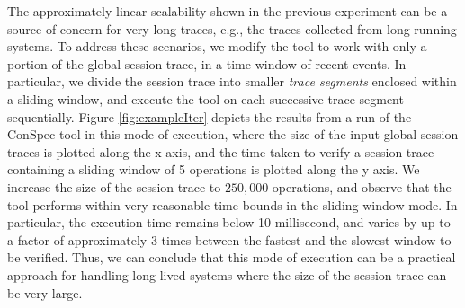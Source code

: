 \documentclass[journal,compsoc]{IEEEtran}
\begin{document}
 \par The approximately linear scalability shown in the previous experiment can be a source of concern for very long traces, e.g., the traces collected from long-running systems. To address these scenarios, we modify the tool to work with only a portion of the global session trace, in a time window of recent events. In particular, we divide the session trace into smaller \emph{trace segments} enclosed within a sliding window, and execute  the tool on  each successive trace segment sequentially.   Figure \ref{fig:exampleIter} depicts the results from a run of the ConSpec tool in this mode of execution, where the size of the input global session traces is plotted along the x axis, and the time taken to verify a session trace containing a sliding window of 5 operations is plotted along the y axis. We increase the size of the session trace to $250,000$ operations, and observe that the tool performs within very reasonable time bounds in the sliding window mode. In particular, the execution time remains below %
   10 millisecond, and varies by up to a factor of approximately 3 times between the fastest and the slowest window to be verified.   Thus, we can conclude that this mode of execution can be a practical approach for handling long-lived systems where the size of the session trace can be very large.
\end{document}
